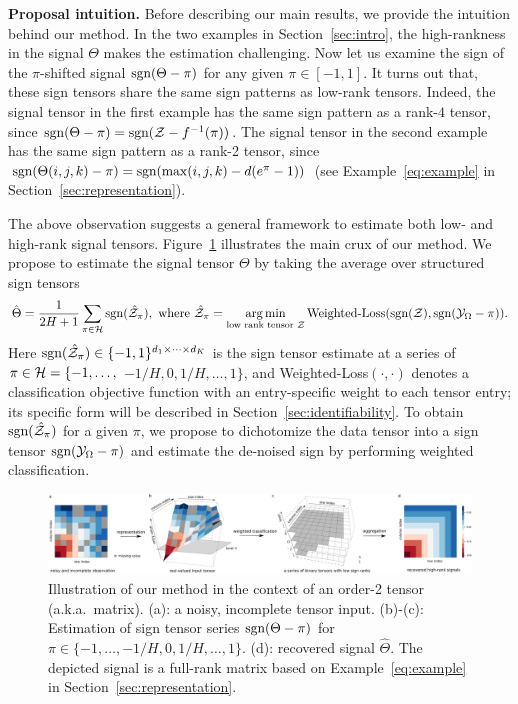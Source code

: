 \documentclass{article}
\theoremstyle{plain}
\theoremstyle{definition}
\def\sign{\textup{sgn}}
\begin{document}
{\bf Proposal intuition.} Before describing our main results, we provide the intuition behind our method. In the two examples in Section~\ref{sec:intro}, the high-rankness in the signal $\Theta$ makes the estimation challenging. Now let us examine the sign of the $\pi$-shifted signal $\sign(\Theta-\pi)$ for any given $\pi\in[-1,1]$. It turns out that, these sign tensors share the same sign patterns as low-rank tensors. Indeed, the signal tensor in the first example has the same sign pattern as a rank-$4$ tensor, since $\sign(\Theta-\pi)=\sign(\tZ-f^{-1}(\pi))$. The signal tensor in the second example has the same sign pattern as a rank-2 tensor, since $\sign(\Theta(i,j,k)-\pi)=\sign(\max(i,j,k)-d(e^{\pi}-1))$ (see Example~\ref{eq:example} in Section~\ref{sec:representation}).

The above observation suggests a general framework to estimate both low- and high-rank signal tensors. Figure~\ref{fig:demo} illustrates the main crux of our method. We propose to estimate the signal tensor $\Theta$ by taking the average over structured sign tensors
\begin{equation}\label{eq:intuition}
\hat \Theta = {1\over 2H+1}\sum_{\pi \in \tH} \sign(\hat \tZ_\pi), \ \text{where}\ \hat \tZ_\pi=\argmin_{\text{low rank tensor $\tZ$}} \text{Weighted-Loss}(\sign(\tZ), \sign (\tY_\Omega-\pi)).
\end{equation}
Here $\sign(\hat \tZ_\pi)\in\{-1,1\}^{d_1\times\cdots\times d_K}$ is the sign tensor estimate at a series of $\pi\in \tH=\{\small-1,\ldots,$ $-{1/H},0, {1/H},\ldots,1\}$, and Weighted-Loss$(\cdot,\cdot)$ denotes a classification objective function with an entry-specific weight to each tensor entry; its specific form will be described in Section~\ref{sec:identifiability}. To obtain $\sign(\hat \tZ_\pi)$ for a given $\pi$, we propose to dichotomize the data tensor into a sign tensor $\sign (\tY_\Omega-\pi)$ and estimate the de-noised sign by performing weighted classification. 

\begin{figure}[h!]
\captionsetup{font=footnotesize}
\centerline{\includegraphics[width=1.05\textwidth]{figure/demo.pdf}}
\caption{Illustration of our method in the context of an order-2 tensor (a.k.a.\ matrix). (a): a noisy, incomplete tensor input. (b)-(c): Estimation of sign tensor series $\sign(\Theta-\pi)$ for $\pi\in  \{-1,\ldots,-{1/ H},0,{1/H},\ldots,1\}$. (d): recovered signal $\hat \Theta$. The depicted signal is a full-rank matrix based on Example~\ref{eq:example} in Section~\ref{sec:representation}.}\label{fig:demo}
\vspace{-.2cm}
\end{figure}
\end{document}
